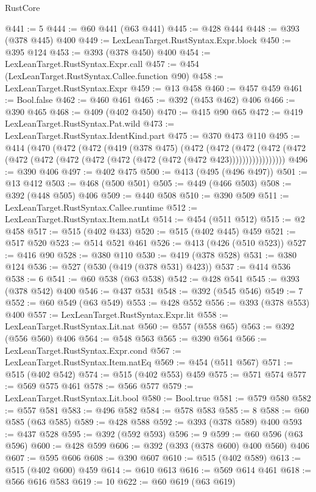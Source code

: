 \begin{lexlean}{RustCore}
\begin{coremodule}
@441 := 5
@444 := @60 @441 (@63 @441)
@445 := @428 @444
@448 := @393 (@378 @445) @400
@449 := LexLeanTarget.RustSyntax.Expr.block
@450 := @395 @124
@453 := @393 (@378 @450) @400
@454 := LexLeanTarget.RustSyntax.Expr.call
@457 := @454 (LexLeanTarget.RustSyntax.Callee.function @90)
@458 := LexLeanTarget.RustSyntax.Expr
@459 := @13 @458
@460 := @457 @459
@461 := Bool.false
@462 := @460 @461
@465 := @392 (@453 @462) @406
@466 := @390 @465
@468 := @409 (@402 @450)
@470 := @415 @90 @65
@472 := @419 LexLeanTarget.RustSyntax.Pat.wild
@473 := LexLeanTarget.RustSyntax.IdentKind.part
@475 := @370 @473 @110
@495 := @414
    (@470
      (@472
        (@472
          (@419
            (@378 @475)
            (@472
              (@472
                (@472
                  (@472 (@472 (@472 (@472 (@472 (@472 (@472 (@472 (@472 (@472 @423)))))))))))))))))
@496 := @390 @406
@497 := @402 @475
@500 := @413 (@495 (@496 @497))
@501 := @13 @412
@503 := @468 (@500 @501)
@505 := @449 (@466 @503)
@508 := @392 (@448 @505) @406
@509 := @440 @508
@510 := @390 @509
@511 := LexLeanTarget.RustSyntax.Callee.runtime
@512 := LexLeanTarget.RustSyntax.Item.natLt
@514 := @454 (@511 @512)
@515 := @2 @458
@517 := @515 (@402 @433)
@520 := @515 (@402 @445) @459
@521 := @517 @520
@523 := @514 @521 @461
@526 := @413 (@426 (@510 @523))
@527 := @416 @90
@528 := @380 @110
@530 := @419 (@378 @528)
@531 := @380 @124
@536 := @527 (@530 (@419 (@378 @531) @423))
@537 := @414 @536
@538 := 6
@541 := @60 @538 (@63 @538)
@542 := @428 @541
@545 := @393 (@378 @542) @400
@546 := @437 @531
@548 := @392 (@545 @546)
@549 := 7
@552 := @60 @549 (@63 @549)
@553 := @428 @552
@556 := @393 (@378 @553) @400
@557 := LexLeanTarget.RustSyntax.Expr.lit
@558 := LexLeanTarget.RustSyntax.Lit.nat
@560 := @557 (@558 @65)
@563 := @392 (@556 @560) @406
@564 := @548 @563
@565 := @390 @564
@566 := LexLeanTarget.RustSyntax.Expr.cond
@567 := LexLeanTarget.RustSyntax.Item.natEq
@569 := @454 (@511 @567)
@571 := @515 (@402 @542)
@574 := @515 (@402 @553) @459
@575 := @571 @574
@577 := @569 @575 @461
@578 := @566 @577
@579 := LexLeanTarget.RustSyntax.Lit.bool
@580 := Bool.true
@581 := @579 @580
@582 := @557 @581
@583 := @496 @582
@584 := @578 @583
@585 := 8
@588 := @60 @585 (@63 @585)
@589 := @428 @588
@592 := @393 (@378 @589) @400
@593 := @437 @528
@595 := @392 (@592 @593)
@596 := 9
@599 := @60 @596 (@63 @596)
@600 := @428 @599
@606 := @392 (@393 (@378 @600) @400 @560) @406
@607 := @595 @606
@608 := @390 @607
@610 := @515 (@402 @589)
@613 := @515 (@402 @600) @459
@614 := @610 @613
@616 := @569 @614 @461
@618 := @566 @616 @583
@619 := 10
@622 := @60 @619 (@63 @619)

\end{coremodule}
\end{lexlean}
